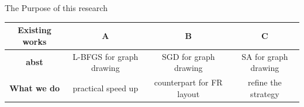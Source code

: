 \documentclass[13pt,aspectratio=169,table,dvipdfmx]{beamer}
\newif\ifShowHidden
\begin{document}
\begin{frame}{The Purpose of this research}
    \begin{table}
        \centering
        \begin{tabular}{c|c|c|c}
            \toprule
            Existing works      & A                        & B                         & C                    \\
            \midrule
            \textbf{abst}       & L-BFGS for graph drawing & SGD for graph drawing     & SA for graph drawing \\
            \textbf{What we do} & practical speed up       & counterpart for FR layout & refine the strategy  \\
            \bottomrule
        \end{tabular}
    \end{table}
\end{frame}

\ifShowHidden
    \begin{frame}{\LARGE{余談: 試した手法群}}
        \begin{itemize}
            \item シンプルなrandom subspace algorithm
            \item (丸茂先生のアドバイスにもあった) 頂点毎にL-BFGSを適用
                  \begin{itemize}
                      \item (cubic regularized Newton以前の問題)
                  \end{itemize}
            \item CG法
            \item stochastic CG法 ``Stochastic Conjugate Gradient Algorithm with
                  Variance Reduction''
            \item L-BFGS法自体の改良の検討 -> 自作だと数値爆発で諦め
            \item 汎用的なフレームワークの開発はこの時点で大分諦めました
        \end{itemize}
    \end{frame}
\fi

\end{document}
